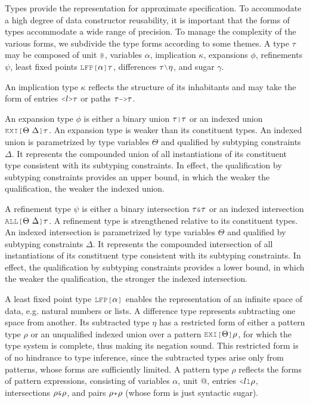 \documentclass[acmsmall]{acmart}
\theoremstyle{definition}
\begin{document}
\noindent
Types provide the representation for approximate specification.
To accommodate a high degree of data constructor reusability,
it is important that the forms of types accommodate a wide range of precision.
To manage the complexity of the various forms, we subdivide the type forms
according to some themes.
A type $\tau$ may be composed of unit $\J{@}$, variables $\alpha$, 
implication $\kappa$, expansions $\phi$, refinements $\psi$,
least fixed points $\J{LFP[}\alpha \J{]} \tau$,
differences $\tau \typdiff \eta$, and sugar $\gamma$.

An implication type $\kappa$ reflects the structure of 
its inhabitants and may take the form of  
entries $\J{<}l\J{>}\tau$ or paths $\tau \J{->} \tau$.

An expansion type $\phi$ is either a binary union $\tau \J{|} \tau$ or 
an indexed union $\J{EXI[}\Theta\ \Delta\J{]}\tau$.
An expansion type is weaker than its constituent types. 
An indexed union is parametrized by type variables $\Theta$ 
and qualified by subtyping constraints $\Delta$.
It represents the compounded union of all instantiations of its constituent type 
consistent with its subtyping constraints.
In effect, the qualification by subtyping constraints provides an upper bound, in which
the weaker the qualification, the weaker the indexed union.

A refinement type $\psi$ is either a binary intersection $\tau \J{\&} \tau$ or 
an indexed intersection $\J{ALL[} \Theta\ \Delta \J{]}\tau$.
A refinement type is strengthened relative to its constituent types. 
An indexed intersection is parametrized by type variables $\Theta$ 
and qualified by subtyping constraints $\Delta$.
It represents the compounded intersection of all instantiations of its constituent type 
consistent with its subtyping constraints.
In effect, the qualification by subtyping constraints provides a lower bound, in which
the weaker the qualification, the stronger the indexed intersection.

A least fixed point type $\J{LFP[}\alpha \J{]}$ 
enables the representation of an infinite space of data,
e.g. natural numbers or lists. 
A difference type represents subtracting one space from another.
Its subtracted type $\eta$ has a restricted form of either
a pattern type $\rho$ or an unqualified indexed union 
over a pattern $\J{EXI[}\Theta \J{]} \rho$, for which the type system
is complete, thus making its negation sound.  
This restricted form is of no hindrance to type inference, since the 
subtracted types arise only from patterns, whose forms are sufficiently
limited.
A pattern type $\rho$ reflects the forms of pattern expressions, consisting of 
variables $\alpha$, unit $@$, entries $\J{<} l \J{l} \rho$, intersections $\rho \J{\&} \rho$,
and pairs $\rho \J{*} \rho$ (whose form is just syntactic sugar).
\end{document}
